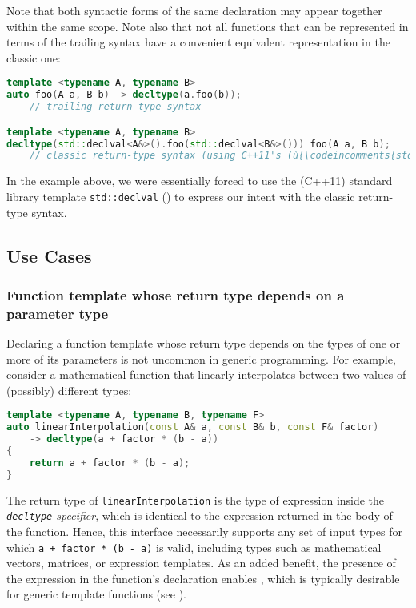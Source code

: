 \noindent Note that both syntactic forms of the same declaration may appear
together within the same scope. Note also that not all functions that
can be represented in terms of the trailing syntax have a convenient
equivalent representation in the classic one:

\begin{lstlisting}[language=C++]
template <typename A, typename B>
auto foo(A a, B b) -> decltype(a.foo(b));
    // trailing return-type syntax

template <typename A, typename B>
decltype(std::declval<A&>().foo(std::declval<B&>())) foo(A a, B b);
    // classic return-type syntax (using C++11's (ù{\codeincomments{std::declval}}ù))
\end{lstlisting}

\noindent In the example above, we were essentially forced to use the (C++11)
standard library template \lstinline!std::declval!
(\cite{cpprefdeclval}) to express our intent with the classic
return-type syntax.

\subsection[Use Cases]{Use Cases}\label{use-cases}

\subsubsection[Function template whose return type depends on a parameter type]{Function template whose return type depends on a parameter type}\label{function-template-whose-return-type-depends-on-a-parameter-type}

Declaring a function template whose return type depends on the types of
one or more of its parameters is not uncommon in generic programming.
For example, consider a mathematical function that linearly interpolates
between two values of (possibly) different types:

\begin{lstlisting}[language=C++]
template <typename A, typename B, typename F>
auto linearInterpolation(const A& a, const B& b, const F& factor)
    -> decltype(a + factor * (b - a))
{
    return a + factor * (b - a);
}
\end{lstlisting}

\noindent The return type of \lstinline!linearInterpolation! is the type of
expression inside the \emph{\lstinline!decltype! specifier}, which is
identical to the expression returned in the body of the function. Hence,
this interface necessarily supports any set of input types for which
\lstinline!a!~\lstinline!+!~\lstinline!factor!~\lstinline!*!~\lstinline!(b!~\lstinline!-!~\lstinline!a)!
is valid, including types such as mathematical vectors, matrices, or
expression templates. As an added benefit, the presence of the
expression in the function's declaration enables , which is typically desirable for generic template functions
(see %
).

